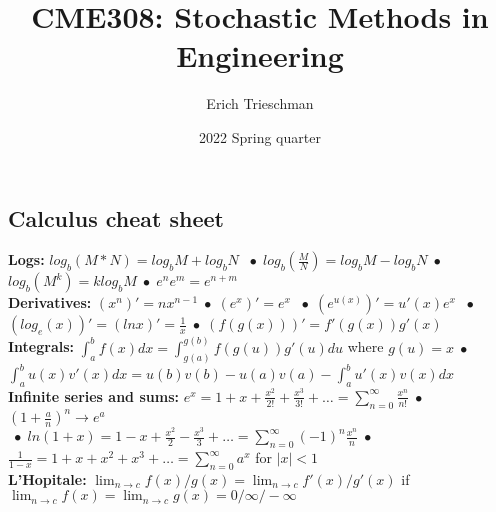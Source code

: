 \documentclass[9pt]{extarticle}
\title{CME308: Stochastic Methods in Engineering}
\author{Erich Trieschman}
\date{2022 Spring quarter}
\newcommand{\abs}[1]{\lvert#1\rvert}
\newcommand*\bspace{$\; \bullet \;$}
\begin{document}

\subsection{Calculus cheat sheet}
\textbf{Logs:} $log_b(M * N) = log_bM + log_bN$ \bspace $log_b(\frac{M}{N}) = log_bM - log_bN$\bspace $log_b(M^k) = klog_bM$\bspace $e^ne^m = e^{n+m}$\\
\textbf{Derivatives:} $(x^n)' = nx^{n-1}$\bspace $(e^x)' = e^x$ \bspace $(e^{u(x)})' = u'(x)e^x$ \bspace $(log_e(x))' = (lnx)' = \frac{1}{x}$\bspace $(f(g(x)))' = f'(g(x))g'(x)$\\
\textbf{Integrals: } $\int_a^b f(x)dx = \int_{g(a)}^{g(b)}f(g(u))g'(u)du$ where $g(u) = x$\bspace $\int_a^b u(x)v'(x)dx = u(b)v(b) - u(a)v(a) - \int_a^b u'(x)v(x)dx$\\
\textbf{Infinite series and sums:} $e^x = 1 + x + \frac{x^2}{2!} + \frac{x^3}{3!} + \dots = \sum_{n=0}^\infty \frac{x^n}{n!}$\bspace $(1 + \frac{a}{n})^n \longrightarrow e^a$\\
\bspace $ln(1 + x) = 1 - x + \frac{x^2}{2} - \frac{x^3}{3} + \dots = \sum_{n=0}^\infty (-1)^n\frac{x^n}{n}$\bspace $\frac{1}{1-x} = 1 + x + x^2 + x^3 + \dots = \sum_{n=0}^\infty a^x$ for $\abs{x} < 1$\\
\textbf{L'Hopitale:} $\lim_{n\rightarrow c} f(x) / g(x) = \lim_{n\rightarrow c} f'(x)/g'(x)$ if $\lim_{n\rightarrow c} f(x) = \lim_{n\rightarrow c} g(x) = 0/\infty/-\infty$
\end{document}
